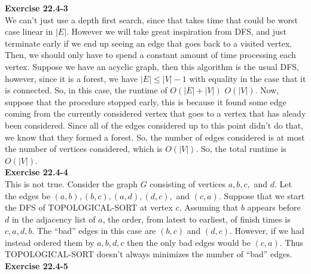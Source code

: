\documentclass{article}
\begin{document}
\noindent\textbf{Exercise 22.4-3}\\

We can't just use a depth first search, since that takes time that could be worst case linear in $|E|$. However we will take great inspiration from DFS, and just terminate early if we end up seeing an edge that goes back to a visited vertex. Then, we should only have to spend a constant amount of time processing each vertex. Suppose we have an acyclic graph, then this algorithm is the usual DFS, however, since it is a forest, we have $|E| \le |V|-1$ with equality in the case that it is connected. So, in this case, the runtime of $O(|E|+|V|)$ $O(|V|)$. Now, suppose that the procedure stopped early, this is because it found some edge coming from the currently considered vertex that goes to a vertex that has aleady been considered. Since all of the edges considered up to this point didn't do that, we know that they formed a forest. So, the number of edges considered is at most the number of vertices considered, which is $O(|V|)$. So, the total runtime is $O(|V|)$.\\

\noindent\textbf{Exercise 22.4-4}\\

This is not true.  Consider the graph $G$ consisting of vertices $a, b, c, $ and $d$.  Let the edges be $(a,b), (b,c), (a,d), (d,c),$ and $(c,a)$.  Suppose that we start the DFS of TOPOLOGICAL-SORT at vertex $c$.  Assuming that $b$ appears before $d$ in the adjacency list of $a$, the order, from latest to earliest, of finish times is $c, a, d, b$. The ``bad'' edges in this case are $(b,c)$ and $(d,c)$.  However, if we had instead ordered them by $a,b,d,c$ then the only bad edges would be $(c,a)$.  Thus TOPOLOGICAL-SORT doesn't always minimizes the number of ``bad'' edges. \\

\noindent\textbf{Exercise 22.4-5}\\
\end{document}
